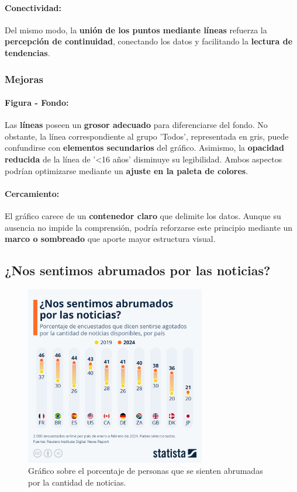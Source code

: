 \documentclass[12pt,a4paper]{article}
\begin{document}
\paragraph{Conectividad:}
Del mismo modo, la \textbf{unión de los puntos mediante líneas} refuerza la \textbf{percepción de continuidad}, conectando los datos y facilitando la \textbf{lectura de tendencias}.

\subsubsection{Mejoras}

\paragraph{Figura - Fondo:}
Las \textbf{líneas} poseen un \textbf{grosor adecuado} para diferenciarse del fondo. No obstante, la línea correspondiente al grupo 'Todos', representada en gris, puede confundirse con \textbf{elementos secundarios} del gráfico. Asimismo, la \textbf{opacidad reducida} de la línea de '<16 años' disminuye su legibilidad. Ambos aspectos podrían optimizarse mediante un \textbf{ajuste en la paleta de colores}.

\paragraph{Cercamiento:}
El gráfico carece de un \textbf{contenedor claro} que delimite los datos. Aunque su ausencia no impide la comprensión, podría reforzarse este principio mediante un \textbf{marco o sombreado} que aporte mayor estructura visual.

\newpage

\subsection{¿Nos sentimos abrumados por las noticias?}
\begin{figure}[h]
    \centering
    \includegraphics[width=0.7\textwidth]{graf3.jpeg}
    \caption{Gráfico sobre el porcentaje de personas que se sienten abrumadas por la cantidad de noticias.}
    \label{fig:graf3}
\end{figure}
\end{document}

